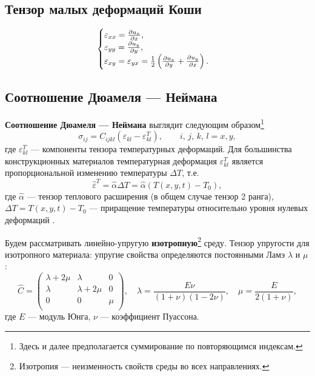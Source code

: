 \documentclass[12pt, a4paper]{article}
\begin{document}
	\subsection{Тензор малых деформаций Коши}
	\begin{equation}
\begin{cases}
	\varepsilon_{xx} = \frac{\partial u_x}{\partial x},\\
	\varepsilon_{yy} = \frac{\partial u_y}{\partial y},\\
	\varepsilon_{xy} =\varepsilon_{yx}= \frac12 \left(\frac{\partial u_x}{\partial y}+\frac{\partial u_y}{\partial x}\right).
	\label{Kochi}
\end{cases}
	\end{equation}
	
	\subsection{Соотношение Дюамеля --- Неймана}
	\textbf{Соотношение Дюамеля --- Неймана} выглядит следующим образом\footnote{Здесь и далее предполагается суммирование по повторяющимся индексам.}
	\begin{equation}
		\sigma_{ij} = C_{ijkl}(\varepsilon_{kl}-\varepsilon_{kl}^T), \qquad i,\,j,\,k,\,l = x,y,
		\label{Hook}
	\end{equation}
	где $\varepsilon_{kl}^T$ --- компоненты тензора температурных деформаций. Для большинства конструкционных материалов температурная деформация $\varepsilon_{kl}^T$ является пропорциональной изменению температуры $\Delta T$, т.е. 
	\[
	\hat{\varepsilon}^T = \hat\alpha \Delta T = \hat\alpha(T(x,y,t)-T_0),
	\]
	где $\hat\alpha$ --- тензор теплового расширения (в общем случае тензор 2 ранга), $\Delta T = T(x,y,t) - T_0$ --- приращение температуры относительно уровня нулевых деформаций \cite{zarubin}.
	
		Будем рассматривать линейно-упругую \textbf{изотропную}\footnote{Изотропия --- неизменность свойств среды во всех направлениях.} среду.
	Тензор упругости для изотропного материала: упругие свойства определяются постоянными Ламэ $\lambda \text{ и } \mu$:
	\begin{equation}
		\hat{C} = 
		\begin{pmatrix}
			\lambda + 2\mu & \lambda &  0 \\
			\lambda & \lambda + 2\mu & 0 \\
			0 &      0 &       \mu \\
		\end{pmatrix},\quad
	\lambda = \frac{E\nu}{(1+\nu)(1-2\nu)},\quad\mu=\frac{E}{2(1+\nu)},
		\label{Flex}
	\end{equation}
где $E$ --- модуль Юнга, $\nu$ --- коэффициент Пуассона.
\end{document}
